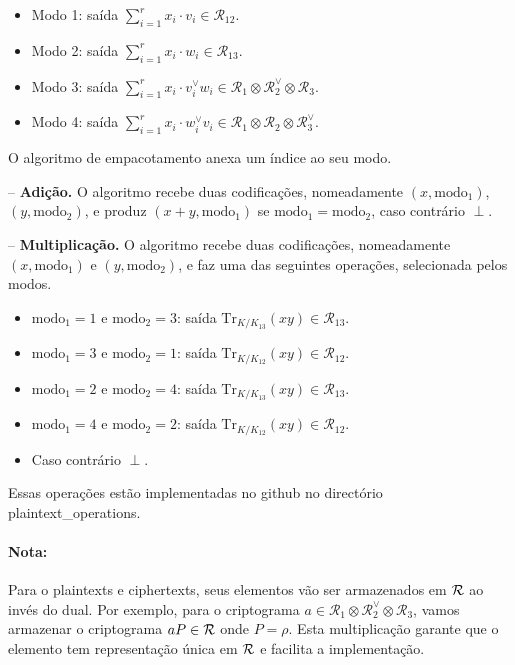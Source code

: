  \begin{itemize}
    \item Modo 1: saída $\sum_{i=1}^r x_i \cdot v_i \in \mathcal{R}_{12}$.
    \item Modo 2: saída $\sum_{i=1}^r x_i \cdot w_i \in \mathcal{R}_{13}$.
    \item Modo 3: saída $\sum_{i=1}^r x_i \cdot v_i^\vee w_i \in \mathcal{R}_1 \otimes \mathcal{R}_2^\vee \otimes \mathcal{R}_3$.
    \item Modo 4: saída $\sum_{i=1}^r x_i \cdot w_i^\vee v_i \in \mathcal{R}_1 \otimes \mathcal{R}_2 \otimes \mathcal{R}_3^\vee$.
\end{itemize}
O algoritmo de empacotamento anexa um índice ao seu modo.

-- \textbf{Adição.} O algoritmo recebe duas codificações, nomeadamente $(x, \text{modo}_1)$, $(y, \text{modo}_2)$, e produz $(x+y, \text{modo}_1)$ se $\text{modo}_1 = \text{modo}_2$, caso contrário $\perp$.

-- \textbf{Multiplicação.} O algoritmo recebe duas codificações, nomeadamente $(x, \text{modo}_1)$ e $(y, \text{modo}_2)$, e faz uma das seguintes operações, selecionada pelos modos.
\begin{itemize}
    \item $\text{modo}_1 = 1 \text{ e } \text{modo}_2 = 3$: saída $\mathrm{Tr}_{K/K_{13}}(xy) \in \mathcal{R}_{13}$.
    \item $\text{modo}_1 =3 \text{ e } \text{modo}_2 = 1$: saída $\mathrm{Tr}_{K/K_{12}}(xy) \in \mathcal{R}_{12}$.
    \item $\text{modo}_1 = 2 \text{ e } \text{modo}_2 = 4$: saída $\mathrm{Tr}_{K/K_{13}}(xy) \in \mathcal{R}_{13}$.
    \item $\text{modo}_1 = 4\text{ e } \text{modo}_2 = 2$: saída $\mathrm{Tr}_{K/K_{12}}(xy) \in \mathcal{R}_{12}$.
    \item Caso contrário $\perp$.
\end{itemize}

Essas operações estão implementadas no github no directório plaintext\_operations. 

\paragraph{Nota:} Para o plaintexts e ciphertexts, seus elementos vão ser armazenados em $\mathcal{R}$ ao invés do dual. Por exemplo, para o criptograma 
$a \in \mathcal{R}_1 \otimes \mathcal{R}_2^\vee \otimes \mathcal{R}_3$, vamos armazenar o criptograma $aP \in \mathcal{R}$ onde $P = \rho$. Esta multiplicação
garante que o elemento tem representação única em $\mathcal{R}$ e facilita a implementação.
